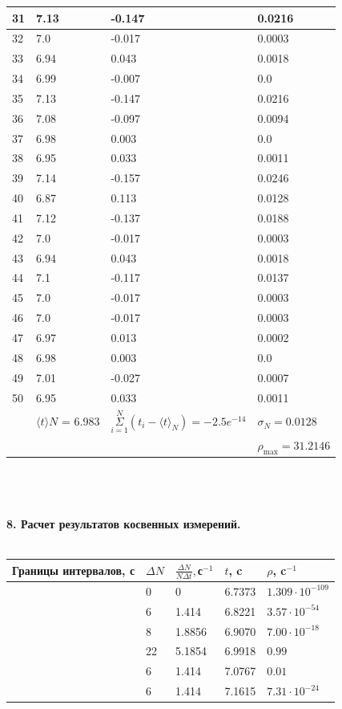 \documentclass[14pt]{article}
\begin{document}
\begin{tabular}{|p{1cm}|p{5cm}|p{5cm}|p{5cm}|}
\hline
31 & 7.13 & -0.147 & 0.0216 \\
\hline
32 & 7.0 & -0.017 & 0.0003 \\
\hline
33 & 6.94 & 0.043 & 0.0018 \\
\hline
34 & 6.99 & -0.007 & 0.0 \\
\hline
35 & 7.13 & -0.147 & 0.0216 \\
\hline
36 & 7.08 & -0.097 & 0.0094 \\
\hline
37 & 6.98 & 0.003 & 0.0 \\
\hline
38 & 6.95 & 0.033 & 0.0011 \\
\hline
39 & 7.14 & -0.157 & 0.0246 \\
\hline
40 & 6.87 & 0.113 & 0.0128 \\
\hline
41 & 7.12 & -0.137 & 0.0188 \\
\hline
42 & 7.0 & -0.017 & 0.0003 \\
\hline
43 & 6.94 & 0.043 & 0.0018 \\
\hline
44 & 7.1 & -0.117 & 0.0137 \\
\hline
45 & 7.0 & -0.017 & 0.0003 \\
\hline
46 & 7.0 & -0.017 & 0.0003 \\
\hline
47 & 6.97 & 0.013 & 0.0002 \\
\hline
48 & 6.98 & 0.003 & 0.0 \\
\hline
49 & 7.01 & -0.027 & 0.0007 \\
\hline
50 & 6.95 & 0.033 & 0.0011 \\ 
		\hline
		& $\langle t \rangle N$ = 6.983 & $\underset{i=1}{\overset{N}{\Sigma}}(t_i-\langle t \rangle_N)=-2.5e^{-14}$ & $\sigma _N= 0.0128 $ \\
		& & & $\rho_{\max}=31.2146$ \\
		\hline
	\end{tabular} \\ \\ \\	
	\textbf{8. Расчет результатов косвенных измерений.} \\ \\ 
	\begin{tabular}{|p{3cm}|p{3cm}|p{3cm}|p{3cm}|p{3cm}|}	
		\hline
		Границы интервалов, с & $\Delta N$ & $\frac{\Delta N}{N \Delta t},$с$^{-1}$ & $t$, c & $\rho$, c$^{-1}$ \\
		\hline
		[6.6949;6.7797] & 0 & 0 & 6.7373 &  $1.309 \cdot 10^{-109}$ \\
		\hline
		[6.7797;6.8646] & 6 & 1.414 & 6.8221 &  $ 3.57 \cdot 10^{-54}$\\
		\hline
		[6.8646;6.9494] & 8 & 1.8856 & 6.9070 & $7.00 \cdot 10^{-18} $ \\
		\hline
		[6.9494;7.0343] & 22 & 5.1854 & 6.9918 & $0.99$\\
		\hline
		[7.0343;7.1191] & 6 & 1.414 & 7.0767 & $0.01$\\
		\hline
		[7.1191;7.204] & 6 & 1.414 & 7.1615 & $7.31 \cdot 10^{-24}$\\
		\hline
	\end{tabular} \\ \\ \\
\end{document}
